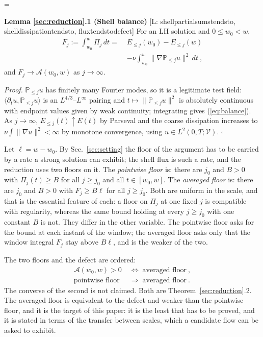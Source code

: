 \documentclass[letterpaper,twocolumn]{article}
\newcommand{\lean}[1]{{\footnotesize\def\_{\textunderscore\allowbreak}%
\hspace{0pt}[L: {\ttfamily\fontdimen3\font=2pt\fontdimen4\font=1pt #1}]}}
\newcommand{\PP}{\mathbb{P}}
\newcommand{\Vc}{\mathcal{V}}
\newcommand{\A}{\mathcal{A}}
\begin{document}
\begin{list}{}{\leftmargin=\parindent\rightmargin=0pt}
\item
\textbf{Lemma \ref{sec:reduction}.1 (Shell balance)}
\lean{shell\_partial\_sums\_tendsto, shell\_dissipation\_tendsto,
flux\_tendsto\_defect}
For an LH solution and $0 \leq w_0 < w$,
\begin{equation}
\label{eq:balance}
\begin{split}
F_j := \int_{w_0}^{w} \Pi_j \, dt = \; & E_{\leq j}(w_0) - E_{\leq j}(w) \\
& - \nu \int_{w_0}^{w} \|\nabla \PP_{\leq j} u\|^2 \, dt \ ,
\end{split}
\end{equation}
and $F_j \to \A(w_0,w)$ as $j \to \infty$.
\end{list}
{\it Proof.} $\PP_{\leq j}u$ has finitely many Fourier
modes, so it is a legitimate test field: $\langle \partial_t u, \PP_{\leq
j} u\rangle$ is an $L^{4/3}$--$L^\infty$ pairing and $t \mapsto
\|\PP_{\leq j} u\|^2$ is absolutely continuous with endpoint values given
by weak continuity; integrating gives (\ref{eq:balance}). As $j \to
\infty$, $E_{\leq j}(t) \uparrow E(t)$ by Parseval and the coarse
dissipation increases to $\nu\int\|\nabla u\|^2 < \infty$ by monotone
convergence, using $u \in L^2(0,T;\Vc)$. \hspace*{\fill}$\square$

Let $\ell = w - w_0$. By Sec.~\ref{sec:setting} the floor of the
argument has to be carried by a rate a strong solution can exhibit; the
shell flux is such a rate, and the reduction uses two floors on it. The
\emph{pointwise floor} is: there are $j_0$ and $B > 0$ with $\Pi_j(t)
\geq B$ for all $j \geq j_0$ and all $t \in [w_0, w]$. The
\emph{averaged floor} is: there are $j_0$ and $B > 0$ with $F_j \geq
B\ell$ for all $j \geq j_0$. Both are uniform in the scale, and that is
the essential feature of each: a floor on $\Pi_j$ at one fixed $j$ is
compatible with regularity, whereas the same bound holding at every $j
\geq j_0$ with one constant $B$ is not. They differ in the other
variable. The pointwise floor asks for the bound at each instant of the
window; the averaged floor asks only that the window integral $F_j$ stay
above $B\ell$, and is the weaker of the two.

The two floors and the defect are ordered:
\[
\begin{aligned}
\A(w_0,w) > 0 \;&\Longleftrightarrow\; \text{averaged floor} \ , \\
\text{pointwise floor} \;&\Longrightarrow\; \text{averaged floor} \ .
\end{aligned}
\]
The converse of the second is not claimed. Both are
Theorem~\ref{sec:reduction}.2. The averaged floor is equivalent to the
defect and weaker than the pointwise floor, and it is the target of this
paper: it is the least that has to be proved, and it is stated in terms
of the transfer between scales, which a candidate flow can be asked to
exhibit.
\end{document}
